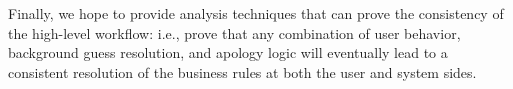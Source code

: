 Finally, we hope to provide analysis techniques that can prove the consistency
of the high-level workflow: i.e., prove that any combination of user behavior,
background guess resolution, and apology logic will eventually lead to a
consistent resolution of the business rules at both the user and system sides.
